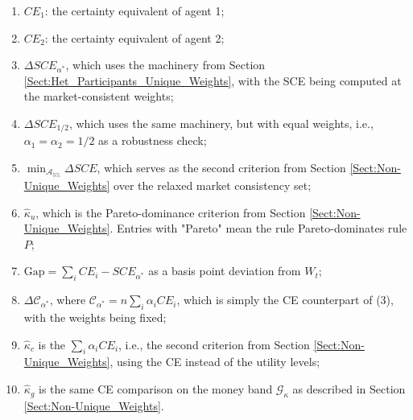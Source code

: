 \documentclass[11pt,a4paper]{article}
\theoremstyle{definition}
\theoremstyle{plain}
\theoremstyle{remark}
\newcommand{\1}{\mathbf{1}}
\begin{document}
\begin{enumerate}[(1)]
    \item $CE_1$: the certainty equivalent of agent 1;
    \item $CE_2$: the certainty equivalent of agent 2;
    \item $\Delta SCE_{\alpha^*}$, which uses the machinery from Section \ref{Sect:Het_Participants_Unique_Weights}, with the SCE being computed at the market-consistent weights;
    \item $\Delta SCE_{1/2}$, which uses the same machinery, but with equal weights, i.e., $\alpha_1 = \alpha_2 = 1/2$ as a robustness check;
    \item $\min_{\mathcal{A}_{5\%}} \Delta SCE$, which serves as the second criterion from Section \ref{Sect:Non-Unique_Weights} over the relaxed market consistency set;
    \item $\hat{\kappa}_u$, which is the Pareto-dominance criterion from Section \ref{Sect:Non-Unique_Weights}. Entries with "Pareto" mean the rule Pareto-dominates rule $P$;
    \item $\text{Gap} = \sum_i CE_i - SCE_{\alpha^*}$ as a basis point deviation from $W_t$;
    \item $\Delta \mathcal{C}_{\alpha^*}$, where $\mathcal{C}_{\alpha^*} = n \sum_i \alpha_i CE_i$, which is simply the CE counterpart of (3), with the weights being fixed;
    \item $\hat{\kappa}_c$ is the $\sum_i \alpha_i CE_i$, i.e., the second criterion from Section \ref{Sect:Non-Unique_Weights}, using the CE instead of the utility levels;
    \item $\hat{\kappa}_g$ is the same CE comparison on the money band $\mathcal{G}_\kappa$ as described in Section \ref{Sect:Non-Unique_Weights}.
\end{enumerate}
\end{document}
